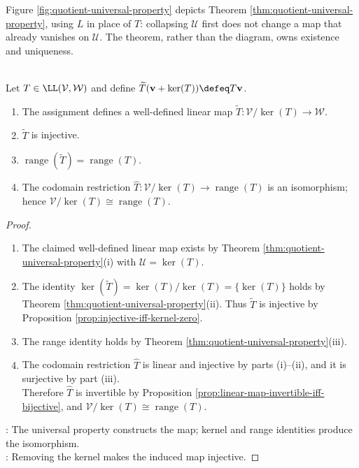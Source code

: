 \begin{illustrationfigure}[H]
  \centering
  
  \caption{If $\mathcal{U}\subseteq\ker(L)$, the map $L$ factors uniquely through the quotient map $\pi$; the dashed arrow is the induced map $\overline{L}$.}
  \label{fig:quotient-universal-property}
\end{illustrationfigure}

Figure \ref{fig:quotient-universal-property} depicts Theorem \ref{thm:quotient-universal-property}, using $L$ in place of $T$: collapsing $\mathcal{U}$ first does not change a map that already vanishes on $\mathcal{U}$. The theorem, rather than the diagram, owns existence and uniqueness.

\begin{theorem} \label{thm:quotient-by-kernel-is-range} \\
Let $T\in\LL(\mathcal{V},\mathcal{W})$ and define $\widetilde{T}(\mathbf{v}+\ker(T))\defeq T\mathbf{v}$.
\begin{enumerate}[label=(\roman*)]
\setlength{\itemsep}{0pt}
\item The assignment defines a well-defined linear map $\widetilde{T}:\mathcal{V}/\ker(T)\to\mathcal{W}$.
\item $\widetilde{T}$ is injective.
\item $\operatorname{range}(\widetilde{T})=\operatorname{range}(T)$.
\item The codomain restriction $\widehat{T}:\mathcal{V}/\ker(T)\to\operatorname{range}(T)$ is an isomorphism; hence $\mathcal{V}/\ker(T)\cong\operatorname{range}(T)$.
\end{enumerate}
\begin{proof}
\begin{enumerate}[label=(\roman*)]
\setlength{\itemsep}{0pt}
\item The claimed well-defined linear map exists by Theorem \ref{thm:quotient-universal-property}(i) with $\mathcal{U}=\ker(T)$.
\item The identity $\ker(\widetilde{T})=\ker(T)/\ker(T)=\{\ker(T)\}$ holds by Theorem \ref{thm:quotient-universal-property}(ii). Thus $\widetilde{T}$ is injective by Proposition \ref{prop:injective-iff-kernel-zero}.
\item The range identity holds by Theorem \ref{thm:quotient-universal-property}(iii).
\item The codomain restriction $\widehat{T}$ is linear and injective by parts (i)--(ii), and it is surjective by part (iii).\\
Therefore $\widehat{T}$ is invertible by Proposition \ref{prop:linear-map-invertible-iff-bijective}, and $\mathcal{V}/\ker(T)\cong\operatorname{range}(T)$.
\end{enumerate}
: The universal property constructs the map; kernel and range identities produce the isomorphism.\\
: Removing the kernel makes the induced map injective.
\end{proof}
\end{theorem}

